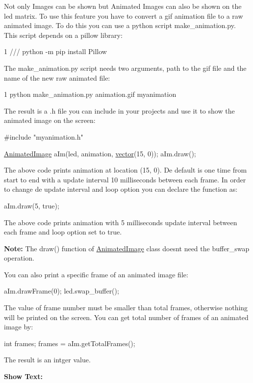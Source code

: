 Not only Images can be shown but Animated Images can also be shown on the led matrix. To use this feature you have to convert a gif animation file to a raw animated image. To do this you can use a python script make\+\_\+animation.\+py. This script depends on a pillow library\+: 
\begin{DoxyCode}
1 /// python -m pip install Pillow
\end{DoxyCode}
 The make\+\_\+animation.\+py script needs two arguments, path to the gif file and the name of the new raw animated file\+: 
\begin{DoxyCode}
1 python make\_animation.py animation.gif myanimation
\end{DoxyCode}
 The result is a .h file you can include in your projects and use it to show the animated image on the screen\+: 
\begin{DoxyCode}
\textcolor{preprocessor}{#include "myanimation.h"}

\hyperlink{class_animated_image}{AnimatedImage} aIm(led, animation, \hyperlink{classvector}{vector}(15, 0));
aIm.draw();
\end{DoxyCode}
 The above code prints animation at location (15, 0). De default is one time from start to end with a update interval 10 milliseconds between each frame. In order to change de update interval and loop option you can declare the function as\+: 
\begin{DoxyCode}
aIm.draw(5, \textcolor{keyword}{true});
\end{DoxyCode}
 The above code prints animation with 5 milliseconds update interval between each frame and loop option set to true.

{\bfseries  Note\+: } The draw() function of \hyperlink{class_animated_image}{Animated\+Image} class doesn\textquotesingle{}t need the buffer\+\_\+swap operation.

You can also print a specific frame of an animated image file\+: 
\begin{DoxyCode}
aIm.drawFrame(0);
led.swap\_buffer();
\end{DoxyCode}
 The value of frame number must be smaller than total frames, otherwise nothing will be printed on the screen. You can get total number of frames of an animated image by\+: 
\begin{DoxyCode}
\textcolor{keywordtype}{int} frames;
frames = aIm.getTotalFrames();
\end{DoxyCode}
 The result is an intger value.

{\bfseries  Show Text\+: }

